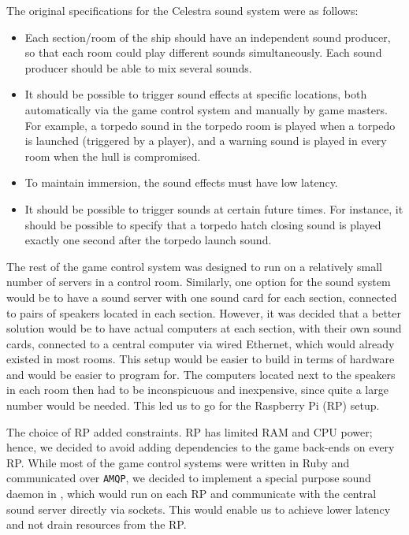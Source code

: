 The original specifications for the Celestra sound system were as follows:
\begin{itemize}
\item Each section/room of the ship should have an independent sound producer, so that each room could play different sounds simultaneously. Each sound producer should be able to mix several sounds.
\item It should be possible to trigger sound effects at specific
  locations, both automatically via the game control system and
  manually by game masters. For example, a torpedo sound in the
  torpedo room is played when a torpedo is launched (triggered by a player), and
  a warning sound is played in every room when the hull is compromised.
\item To maintain immersion, the sound effects must have low latency.
\item It should be possible to trigger sounds at certain future times. For instance, it should be possible to specify that a torpedo hatch closing sound is played exactly one second after the torpedo launch sound.
\end{itemize}

The rest of the game control system was designed to run on a
relatively small number of servers in a control room. Similarly,  one
option for the sound system would be to have a sound server with one
sound card for each section, connected to pairs of speakers located
in each section. However, it was decided that a better solution would
be to have actual computers at each section, with their own sound
cards, connected to a central computer via wired Ethernet, which would
already existed in most rooms. This setup would be easier to build in
terms of hardware and would be easier to program for. The computers
located next to the speakers in each room then had to be inconspicuous
and inexpensive, since quite a large number would be needed. This led us to go
for the Raspberry Pi (RP) setup.

The choice of RP added constraints. RP has limited RAM and CPU power;
hence, we decided to avoid adding dependencies to the game back-ends on
every RP\@. While most of the game control systems were written in Ruby
and communicated over \texttt{AMQP}, we decided to implement a
special purpose sound daemon in \Cpp, which would run on each RP and
communicate with the central sound server directly via sockets. This
would enable us to achieve lower latency and not drain resources from
the RP\@.

